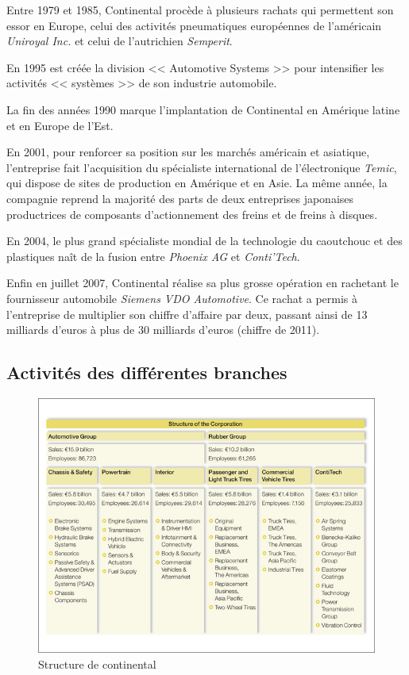 Entre 1979 et 1985, Continental procède à plusieurs rachats qui permettent son essor en Europe, celui des activités pneumatiques européennes de l'américain \textit{Uniroyal Inc.} et celui de l'autrichien \textit{Semperit}.

En 1995 est créée la division << Automotive Systems >> pour intensifier les activités << systèmes >> de son industrie automobile.

La fin des années 1990 marque l'implantation de Continental en Amérique latine et en Europe de l'Est.

En 2001, pour renforcer sa position sur les marchés américain et asiatique, l'entreprise fait l'acquisition du spécialiste international de l'électronique \textit{Temic}, qui dispose de sites de production en Amérique et en Asie. La même année, la compagnie reprend la majorité des parts de deux entreprises japonaises productrices de composants d'actionnement des freins et de freins à disques. 

En 2004, le plus grand spécialiste mondial de la technologie du caoutchouc et des plastiques naît de la fusion entre \textit{Phoenix AG} et \textit{Conti'Tech}.

Enfin en juillet 2007, Continental réalise sa plus grosse opération en rachetant le fournisseur automobile \textit{Siemens VDO Automotive}. Ce rachat a permis à l'entreprise de multiplier son chiffre d'affaire par deux, passant ainsi de 13 milliards d'euros à plus de 30 milliards d'euros (chiffre de 2011).
		
		\subsection{Activités des différentes branches}
		\begin{figure}[H]
			\centering
			\includegraphics[width=18cm]{contents/images/structureConti.jpg}
			\caption{Structure de continental}
			\label{fig:structConti}
		\end{figure}

